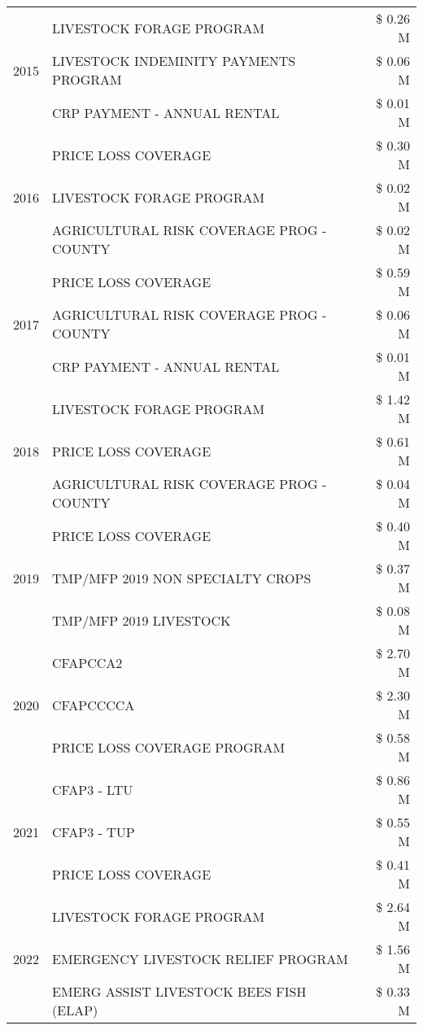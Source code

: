 \begin{tabular}{llr}
\cline{1-3}
\multirow[t]{3}{*}{2015} & LIVESTOCK FORAGE PROGRAM & \$ 0.26 M \\
 & LIVESTOCK INDEMINITY PAYMENTS PROGRAM & \$ 0.06 M \\
 & CRP PAYMENT - ANNUAL RENTAL & \$ 0.01 M \\
\cline{1-3}
\multirow[t]{3}{*}{2016} & PRICE LOSS COVERAGE & \$ 0.30 M \\
 & LIVESTOCK FORAGE PROGRAM & \$ 0.02 M \\
 & AGRICULTURAL RISK COVERAGE PROG - COUNTY & \$ 0.02 M \\
\cline{1-3}
\multirow[t]{3}{*}{2017} & PRICE LOSS COVERAGE & \$ 0.59 M \\
 & AGRICULTURAL RISK COVERAGE PROG - COUNTY & \$ 0.06 M \\
 & CRP PAYMENT - ANNUAL RENTAL & \$ 0.01 M \\
\cline{1-3}
\multirow[t]{3}{*}{2018} & LIVESTOCK FORAGE PROGRAM & \$ 1.42 M \\
 & PRICE LOSS COVERAGE & \$ 0.61 M \\
 & AGRICULTURAL RISK COVERAGE PROG - COUNTY & \$ 0.04 M \\
\cline{1-3}
\multirow[t]{3}{*}{2019} & PRICE LOSS COVERAGE & \$ 0.40 M \\
 & TMP/MFP 2019 NON SPECIALTY CROPS & \$ 0.37 M \\
 & TMP/MFP 2019 LIVESTOCK & \$ 0.08 M \\
\cline{1-3}
\multirow[t]{3}{*}{2020} & CFAPCCA2 & \$ 2.70 M \\
 & CFAPCCCCA & \$ 2.30 M \\
 & PRICE LOSS COVERAGE PROGRAM & \$ 0.58 M \\
\cline{1-3}
\multirow[t]{3}{*}{2021} & CFAP3 - LTU & \$ 0.86 M \\
 & CFAP3 - TUP & \$ 0.55 M \\
 & PRICE LOSS COVERAGE & \$ 0.41 M \\
\cline{1-3}
\multirow[t]{3}{*}{2022} & LIVESTOCK FORAGE PROGRAM & \$ 2.64 M \\
 & EMERGENCY LIVESTOCK RELIEF PROGRAM & \$ 1.56 M \\
 & EMERG ASSIST LIVESTOCK BEES FISH (ELAP) & \$ 0.33 M \\
\cline{1-3}
\bottomrule
\end{tabular}
